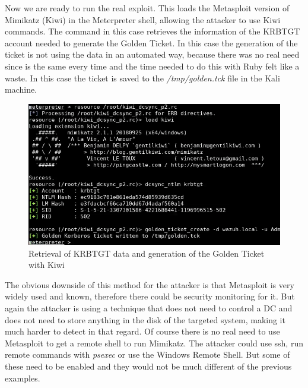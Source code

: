 Now we are ready to run the real exploit. This loads the Metasploit version of Mimikatz (Kiwi) in the Meterpreter shell, allowing the attacker to use Kiwi commands.
The command in this case retrieves the information of the KRBTGT account needed to generate the Golden Ticket.
\linej
In this case the generation of the ticket is not using the data in an automated way, because there was no real need since is the same every time and the time needed to do this with Ruby felt like a waste. In this case the ticket is saved to the \textit{/tmp/golden.tck} file in the Kali machine.
\linej

\begin{figure}[H]
	\centering
	\includegraphics[width=\textwidth]{figuras/kiwi_p2.png}
	\caption{Retrieval of KRBTGT data and generation of the Golden Ticket with Kiwi}
\end{figure}
The obvious downside of this method for the attacker is that Metasploit is very widely used and known, therefore there could be security monitoring for it\cite{detect_metasploit_traffic}. But again the attacker is using a technique that does not need to control a DC and does not need to store anything in the disk of the targeted system, making it much harder to detect in that regard.
\linej
\linej
Of course there is no real need to use Metasploit to get a remote shell to run Mimikatz. The attacker could use ssh, run remote commands with \textit{psexec} or use the Windows Remote Shell. But some of these need to be enabled and they would not be much different of the previous examples.

